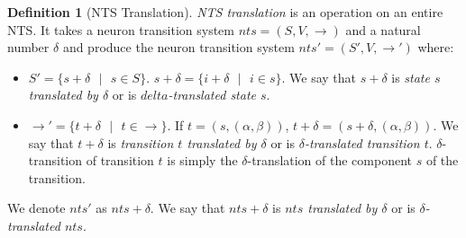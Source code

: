 \documentclass[]{elsarticle}
\theoremstyle{definition}
\newtheorem{definition2}{Definition}
\theoremstyle{definition}
\newcommand{\ra}{\rightarrow}
\newcommand{\se}{\text{ }}
\newcommand{\comment}[1]{}
\begin{document}
\comment
{
We will define two operations on labelled transition systems, \emph{LTS translation} and \emph{LTS
scaling}. The idea behind these operations is that they take an LTS and a parameter $\delta$ and 
produce a new LTS that behaves exactly like the original LTS. When you are combining two different
rule sets from two different neurons in order to have common rule set, simply getting the union of
the two rule sets can cause conflicts. For example, let $\{a \ra a, a^2/a\ra a\}$ be the rule set 
of neuron $x$ and $\{a\ra\lambda,a^2/a\ra a\}$ be the rule set of neuron $y$. If we simply combine
the rule sets to have the common rule set $\{a\ra\lambda,a\ra a, a^2/a\ra a\}$ for both neurons
$x$ and $y$, there will be an unwanted behavior. If neuron $x$ has $1$ spike it
should use the rule $a\ra a$ and if neuron $y$ has $1$ spike it should use the rule $a\ra \lambda$.
If neurons $x$ and $y$ use the common rule set, when they have $1$ spike both of them will have
a non-deterministic choice, use rule $a\ra \lambda$ or use rule $a\ra a$. This non-determinism is 
an unwanted behavior that is the result of rule $a\ra\lambda$ `conflicting' with rule $a\ra a$. The 
common rule set changes the behavior of both neuron $x$ and neuron $y$. LTS translation and LTS 
scaling will be used to avoid such conflicts and changes in the neurons' behavior when combining
different rule sets. 
}


\begin{definition2}[NTS Translation]
\emph{NTS translation} is an operation on an entire NTS. It takes a neuron transition system $nts=
(S,V,\ra)$ and a natural number $\delta$ and produce the neuron transition system $nts'=(S',V,\ra')$
where:
\begin{itemize}
   \item $S'=\{s+\delta\se|\se s \in S\}$. $s+\delta = \{i+\delta\se|\se i\in s\}$. We say that $s+
         \delta$ is \emph{state $s$ translated by $\delta$} or is \emph{$delta$-translated state 
         $s$}.
   \item $\ra'=\{t+\delta \se|\se t\in \ra \}$. If $t=(s, (\alpha,\beta))$, $t+\delta=(s+\delta,
         (\alpha,\beta))$. We say that $t+\delta$ is \emph{transition $t$ translated by $\delta$}
         or is \emph{$\delta$-translated transition $t$}. $\delta$-transition of transition $t$ is 
         simply the $\delta$-translation of the component $s$ of the transition.
\end{itemize}
We denote $nts'$ as $nts+\delta$. We say that $nts+\delta$ is \emph{$nts$ translated by $\delta$} or
is \emph{$\delta$-translated $nts$}.
\end{definition2}
\end{document}
